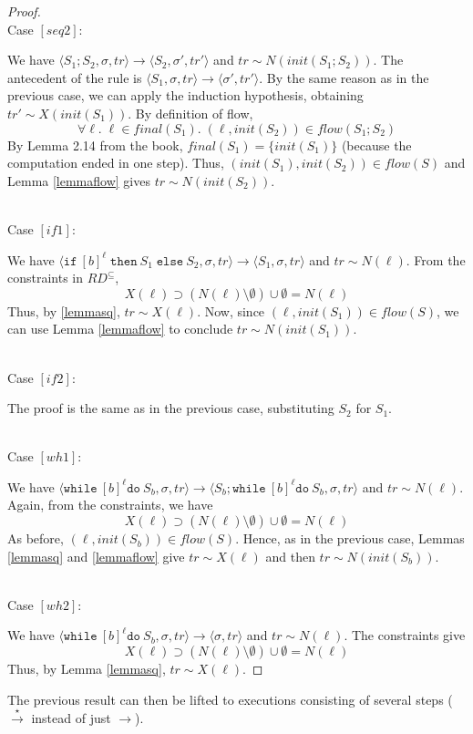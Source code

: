 \documentclass[a4wide,12pt]{article}
\theoremstyle{definition}
\theoremstyle{plain}
\theoremstyle{remark}
\def\const#1{\mathopen{\langle}#1\mathclose{\rangle}} %
\def\pair#1{\const{#1}}
\def\whilel{\texttt{while}\ }
\def\dol {\texttt{do}\ }
\def\ifl {\texttt{if}\ }
\def\thenl {\texttt{then}\ }
\def\elsel {\texttt{else}\ }
\def\starto{\overset{\star}{\to}}
\begin{document}
\begin{proof}
~\\
Case $[seq2]$:

We have $\pair{S_1;S_2,\sigma,tr} \to \pair{S_2,\sigma',tr'}$ and $tr \sim N(init(S_1;S_2))$.
The antecedent of the rule is $\pair{S_1,\sigma,tr} \to \pair{\sigma',tr'}$.
By the same reason as in the previous case, we can apply the induction hypothesis, obtaining
$tr' \sim X(init(S_1))$. By definition of flow, \[\forall \ell . \; \ell \in final(S_1). \;(\ell,init(S_2)) \in flow(S_1;S_2)\]
By Lemma 2.14 from the book, $final(S_1) = \{init(S_1)\}$ (because the computation ended in one step). Thus,
$(init(S_1),init(S_2)) \in flow(S)$ and Lemma \ref{lemmaflow} gives $tr \sim N(init(S_2))$.

~\\
Case $[if1]$:

We have $\pair{\ifl [b]^\ell\; \thenl S_1\; \elsel S_2,\sigma,tr} \to \pair{S_1,\sigma,tr}$ and $tr \sim N(\ell)$.
From the constraints in $RD^{\subseteq}$, 
\[ X(\ell) \supset (N(\ell) \setminus \emptyset) \cup \emptyset = N(\ell)\]
Thus, by \ref{lemmasq}, $tr \sim X(\ell)$. Now, since $(\ell,init(S_1)) \in flow(S)$, we can use Lemma \ref{lemmaflow}
to conclude $tr \sim N(init(S_1))$.

~\\
Case $[if2]$:

The proof is the same as in the previous case, substituting $S_2$ for $S_1$.

~\\
Case $[wh1]$:

We have $\pair{\whilel [b]^\ell \dol S_b,\sigma,tr} \to \pair{S_b;\whilel [b]^\ell \dol S_b,\sigma,tr}$ and $tr \sim N(\ell)$.
Again, from the constraints, we have
\[X(\ell) \supset (N(\ell) \setminus \emptyset) \cup \emptyset = N(\ell)\]
As before, $(\ell,init(S_b)) \in flow(S)$. Hence, as in the previous case, Lemmas \ref{lemmasq} and \ref{lemmaflow} give
$tr \sim X(\ell)$ and then
$tr \sim N(init(S_b))$.

~\\
Case $[wh2]$:

We have $\pair{\whilel [b]^\ell \dol S_b,\sigma,tr} \to \pair{\sigma,tr}$ and $tr \sim N(\ell)$.
The constraints give
\[X(\ell) \supset (N(\ell) \setminus \emptyset) \cup \emptyset = N(\ell)\]
Thus, by Lemma \ref{lemmasq}, $tr \sim X(\ell)$.

\end{proof}


The previous result can then be lifted to executions consisting of several steps
($\starto$ instead of just $\to$).
\end{document}
